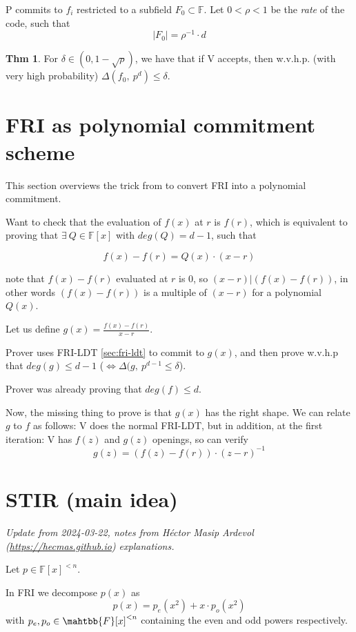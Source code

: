 \documentclass{article}
\theoremstyle{definition}
\newtheorem{theorem}[definition]{Thm}
\begin{document}
P commits to $f_i$ restricted to a subfield $F_0 \subset \mathbb{F}$.
Let $0<\rho<1$ be the \emph{rate} of the code, such that
$$|F_0| = \rho^{-1} \cdot d$$

\begin{theorem}
	For $\delta \in (0, 1-\sqrt{\rho})$, we have that if V accepts, then w.v.h.p. (with very high probability) $\Delta(f_0,~ p^d) \leq \delta$.
\end{theorem}

\section{FRI as polynomial commitment scheme}
This section overviews the trick from \cite{cryptoeprint:2019/1020} to convert FRI into a polynomial commitment.

Want to check that the evaluation of $f(x)$ at $r$ is $f(r)$, which is equivalent to proving that $\exists ~Q \in \mathbb{F}[x]$ with $deg(Q)=d-1$, such that

$$
f(x)-f(r) = Q(x) \cdot (x-r)
$$

note that $f(x)-f(r)$ evaluated at $r$ is $0$, so $(x-r) | (f(x)-f(r))$, in other words
$(f(x)-f(r))$ is a multiple of $(x-r)$ for a polynomial $Q(x)$.

Let us define $g(x) = \frac{f(x)-f(r)}{x-r}$.

Prover uses FRI-LDT \ref{sec:fri-ldt} to commit to $g(x)$, and then prove w.v.h.p that $deg(g) \leq d-1$ ($\Longleftrightarrow \Delta(g,~ p^{d-1} \leq \delta$).

Prover was already proving that $deg(f) \leq d$.

Now, the missing thing to prove is that $g(x)$ has the right shape. We can relate $g$ to $f$ as follows:
V does the normal FRI-LDT, but in addition, at the first iteration:
V has $f(z)$ and $g(z)$ openings, so can verify
$$g(z) = (f(z)-f(r))\cdot (z-r)^{-1}$$


\section{STIR (main idea)}
\emph{Update from 2024-03-22, notes from Héctor Masip Ardevol (\href{https://hecmas.github.io/}{https://hecmas.github.io}) explanations.}

\vspace{0.3cm}
Let $p \in \mathbb{F}[x]^{<n}$.

In FRI we decompose $p(x)$ as
$$p(x) = p_e(x^2) + x \cdot p_o(x^2)$$
with $p_e, p_o \in \mahtbb{F}[x]^{<n}$ containing the even and odd powers respectively.
\end{document}
